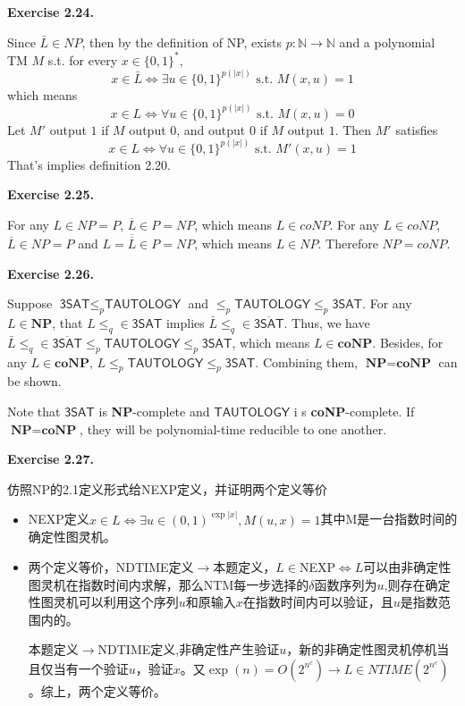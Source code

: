 \documentclass[a4paper]{article}
\newenvironment{exercise}[1]{
	\par
	\noindent\textbf{Exercise #1.}\quad
}{
	\par
	\bigskip
}
\begin{document}
	\begin{exercise}{2.24}
	Since $\bar{L} \in NP$, then by the definition of NP, exists $p: \mathbb{N}\rightarrow \mathbb{N}$ and a polynomial TM $M$ s.t. for every $x \in \{0,1\}^{*}$,
$$x \in \bar{L} \Leftrightarrow \exists u \in \{0,1\}^{p(|x|)} \text{ s.t. } M(x,u) = 1$$
which means
$$x \in L \Leftrightarrow \forall u \in \{0,1\}^{p(|x|)} \text{ s.t. } M(x,u) = 0$$
Let $M'$ output $1$ if $M$ output $0$, and output $0$ if $M$ output $1$.
Then $M'$ satisfies
$$x \in L \Leftrightarrow \forall u \in \{0,1\}^{p(|x|)} \text{ s.t. } M'(x,u) = 1$$
That's implies definition 2.20.
\end{exercise}

    \begin{exercise}{2.25}
        For any $L\in NP=P$, $\overline{L}\in P=NP$, which means $L\in coNP$.
        For any $L\in coNP$, $\overline{L}\in NP=P$ and $L=\overline{\overline{L}}\in P=NP$, which means $L\in NP$.
        Therefore $NP=coNP$.
    \end{exercise}
	
	\begin{exercise}{2.26}
		Suppose $\textsf{3SAT} \leq_p \textsf{TAUTOLOGY}$ and $ \leq_p \textsf{TAUTOLOGY} \leq_p \textsf{3SAT}$. For any $L \in \textbf{NP}$, that $L \leq_q \in \textsf{3SAT}$ implies $\bar L \leq_q \in \overline{\textsf{3SAT}}$. Thus, we have $\bar L \leq_q \in \overline{\textsf{3SAT}} \leq_p \textsf{TAUTOLOGY} \leq_p \textsf{3SAT}$, which means $L \in \textbf{coNP}$. Besides, for any $L \in \textbf{coNP}$, $L \leq_p \textsf{TAUTOLOGY} \leq_p \textsf{3SAT}$. Combining them, $\textbf{NP} = \textbf{coNP}$ can be shown.

		Note that $\textsf{3SAT}$ is \textbf{NP}-complete and $\textsf{TAUTOLOGY}$ i s \textbf{coNP}-complete. If $\textbf{NP} = \textbf{coNP}$, they will be polynomial-time reducible to one another.
	\end{exercise}

	\begin{exercise}{2.27}
		仿照NP的2.1定义形式给NEXP定义，并证明两个定义等价
		\begin{itemize}
			\item [1.] NEXP定义$x\in L \iff\exists u\in (0,1)^{\exp|x|},M(u,x)=1$其中M是一台指数时间的确定性图灵机。
			\item [2.] 两个定义等价，NDTIME定义$\to$本题定义，$L\in $NEXP$\iff L$可以由非确定性图灵机在指数时间内求解，那么NTM每一步选择的$\delta$函数序列为$u$,则存在确定性图灵机可以利用这个序列$u$和原输入$x$在指数时间内可以验证，且$u$是指数范围内的。

				本题定义$\to$NDTIME定义,非确定性产生验证$u$，新的非确定性图灵机停机当且仅当有一个验证$u$，验证$x$。又$\exp(n) =O(2^{n^c})\to L\in NTIME(2^{n^c})$。综上，两个定义等价。
		\end{itemize}
	\end{exercise}
\end{document}
